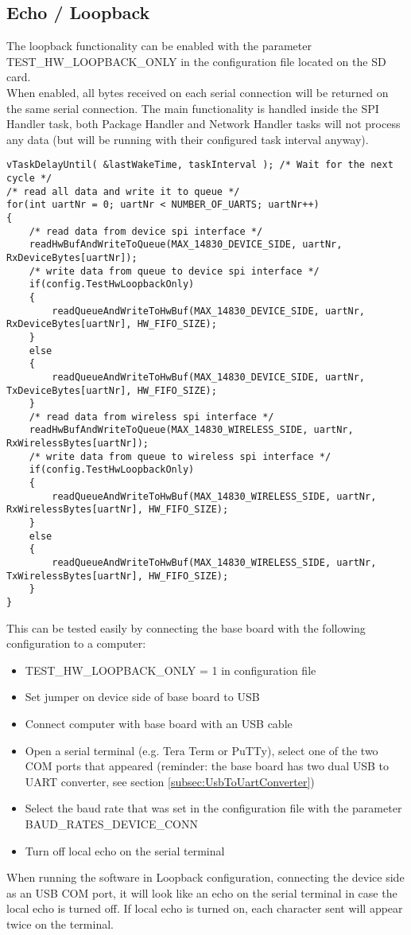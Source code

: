 \subsection{Echo / Loopback} \label{subsec:txtTestLoopback}
The loopback functionality can be enabled with the parameter TEST\_HW\_LOOPBACK\_ONLY in the configuration file located on the SD card.\\
When enabled, all bytes received on each serial connection will be returned on the same serial connection. The main functionality is handled inside the SPI Handler task, both Package Handler and Network Handler tasks will not process any data (but will be running with their configured task interval anyway).
\begin{lstlisting}
vTaskDelayUntil( &lastWakeTime, taskInterval ); /* Wait for the next cycle */
/* read all data and write it to queue */
for(int uartNr = 0; uartNr < NUMBER_OF_UARTS; uartNr++)
{
    /* read data from device spi interface */
    readHwBufAndWriteToQueue(MAX_14830_DEVICE_SIDE, uartNr, RxDeviceBytes[uartNr]);
    /* write data from queue to device spi interface */
    if(config.TestHwLoopbackOnly)
    {
        readQueueAndWriteToHwBuf(MAX_14830_DEVICE_SIDE, uartNr, RxDeviceBytes[uartNr], HW_FIFO_SIZE);
    }
    else
    {
        readQueueAndWriteToHwBuf(MAX_14830_DEVICE_SIDE, uartNr, TxDeviceBytes[uartNr], HW_FIFO_SIZE);
    }
    /* read data from wireless spi interface */
    readHwBufAndWriteToQueue(MAX_14830_WIRELESS_SIDE, uartNr, RxWirelessBytes[uartNr]);
    /* write data from queue to wireless spi interface */
    if(config.TestHwLoopbackOnly)
    {
        readQueueAndWriteToHwBuf(MAX_14830_WIRELESS_SIDE, uartNr, RxWirelessBytes[uartNr], HW_FIFO_SIZE);
    }
    else
    {
        readQueueAndWriteToHwBuf(MAX_14830_WIRELESS_SIDE, uartNr, TxWirelessBytes[uartNr], HW_FIFO_SIZE);
    }
}
\end{lstlisting}
This can be tested easily by connecting the base board with the following configuration to a computer:
\begin{itemize}
    \item TEST\_HW\_LOOPBACK\_ONLY = 1 in configuration file
    \item Set jumper on device side of base board to USB
    \item Connect computer with base board with an USB cable
    \item Open a serial terminal (e.g. Tera Term or PuTTy), select one of the two COM ports that appeared (reminder: the base board has two dual USB to UART converter, see section \autoref{subsec:UsbToUartConverter})
    \item Select the baud rate that was set in the configuration file with the parameter BAUD\_RATES\_DEVICE\_CONN
    \item Turn off local echo on the serial terminal
\end{itemize}
When running the software in Loopback configuration, connecting the device side as an USB COM port, it will look like an echo on the serial terminal in case the local echo is turned off. If local echo is turned on, each character sent will appear twice on the terminal.
%
%
